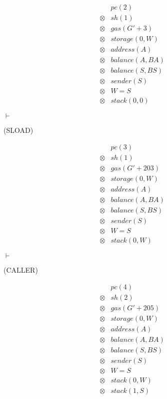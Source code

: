 \[
  \begin{array}{rcl}
    &&pc(2)\\
    &\otimes&sh(1)\\
    &\otimes&gas(G' + 3)\\
    &\otimes&storage(0, W)\\
    &\otimes&address(A)\\
    &\otimes&balance(A, BA)\\
    &\otimes&balance(S, BS)\\
    &\otimes&sender(S)\\
    &\otimes& W = S\\
    &\otimes& stack(0, 0)
  \end{array}
\]

$\vdash$ \begin{flushright}(SLOAD)\end{flushright}

\[
  \begin{array}{rcl}
    &&pc(3)\\
    &\otimes&sh(1)\\
    &\otimes&gas(G' + 203)\\
    &\otimes&storage(0, W)\\
    &\otimes&address(A)\\
    &\otimes&balance(A, BA)\\
    &\otimes&balance(S, BS)\\
    &\otimes&sender(S)\\
    &\otimes& W = S\\
    &\otimes& stack(0, W)
  \end{array}
\]

$\vdash$ \begin{flushright}(CALLER)\end{flushright}

\[
  \begin{array}{rcl}
    &&pc(4)\\
    &\otimes&sh(2)\\
    &\otimes&gas(G' + 205)\\
    &\otimes&storage(0, W)\\
    &\otimes&address(A)\\
    &\otimes&balance(A, BA)\\
    &\otimes&balance(S, BS)\\
    &\otimes&sender(S)\\
    &\otimes& W = S\\
    &\otimes& stack(0, W)\\
    &\otimes& stack(1, S)
  \end{array}
\]

